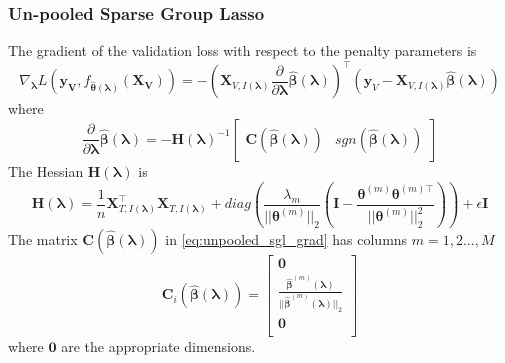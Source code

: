\documentclass[12pt,letterpaper]{article}
\begin{document}
\subsubsection{Un-pooled Sparse Group Lasso}

The gradient of the validation loss with respect to the penalty parameters is
\begin{equation}
\nabla_{\boldsymbol \lambda} L(\boldsymbol{y_V}, f_{\hat{\boldsymbol{\theta}}(\boldsymbol{\lambda})}(\boldsymbol{X_V})) =
-\left (
\boldsymbol{X}_{V, I(\boldsymbol\lambda)}
\frac{\partial}{\partial \boldsymbol\lambda} \hat{\boldsymbol{\beta}}(\boldsymbol{\lambda})
\right )^\top
\left (
\boldsymbol{y}_V - \boldsymbol{X}_{V, I(\boldsymbol\lambda)} \hat{\boldsymbol{\beta}}(\boldsymbol{\lambda})
\right )
\end{equation}
where 
\begin{equation}
\frac{\partial}{\partial \boldsymbol \lambda} \hat{\boldsymbol{\beta}}(\boldsymbol{\lambda})
=
- \boldsymbol H(\boldsymbol \lambda)^{-1}
\begin{bmatrix}
\boldsymbol C(\hat{\boldsymbol \beta}(\boldsymbol \lambda)) & sgn(\hat {\boldsymbol \beta}(\boldsymbol \lambda))
\end{bmatrix}
\label{eq:unpooled_sgl_grad}
\end{equation}
The Hessian $\boldsymbol H(\boldsymbol \lambda)$ is
\begin{equation}
\boldsymbol{H}(\boldsymbol\lambda) =
\frac{1}{n} \boldsymbol X_{T, I(\boldsymbol \lambda)}^\top \boldsymbol X_{T, I(\boldsymbol \lambda)}
+ diag\left(
\frac{\lambda_m}{|| \boldsymbol \theta^{(m)}||_2}
\left (
\boldsymbol I - 
\frac{\boldsymbol \theta^{(m)} \boldsymbol \theta^{(m) \top}}{|| \boldsymbol \theta^{(m)}||_2^2}
\right )
\right)
+ \epsilon \boldsymbol I
\label{eq:sgl_hessian}
\end{equation}
The matrix $\boldsymbol C(\hat {\boldsymbol \beta}(\boldsymbol \lambda))$ in \eqref{eq:unpooled_sgl_grad} has columns $m=1,2...,M$ 
\begin{equation}
\boldsymbol{C}_i(\hat{\boldsymbol \beta}( \boldsymbol \lambda))
=
\begin{bmatrix}
\boldsymbol 0\\
\frac{\hat {\boldsymbol \beta}^{(m)}(\boldsymbol \lambda)}{||\hat{\boldsymbol \beta}^{(m)}(\boldsymbol \lambda)||_2}\\
\boldsymbol 0\\
\end{bmatrix}
\end{equation}
where $\boldsymbol 0$ are the appropriate dimensions.
\end{document}
